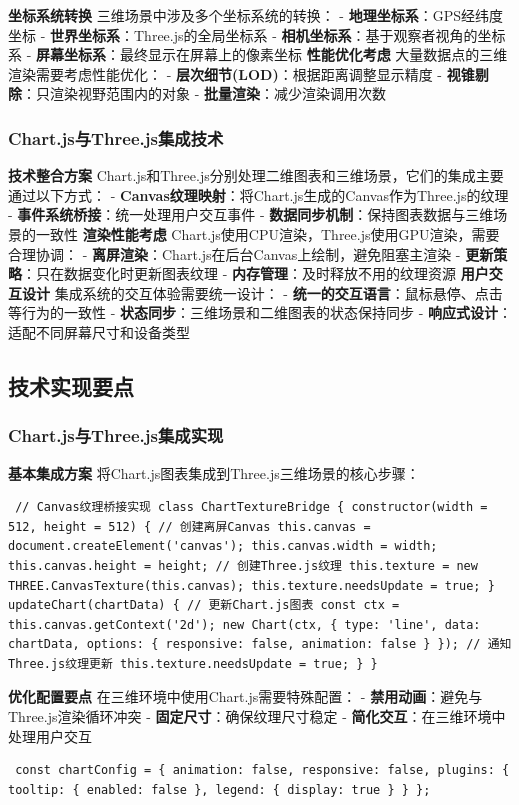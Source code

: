 \textbf{坐标系统转换} 三维场景中涉及多个坐标系统的转换： - \textbf{地理坐标系}：GPS经纬度坐标 - \textbf{世界坐标系}：Three.js的全局坐标系 - \textbf{相机坐标系}：基于观察者视角的坐标系 - \textbf{屏幕坐标系}：最终显示在屏幕上的像素坐标 \textbf{性能优化考虑} 大量数据点的三维渲染需要考虑性能优化： - \textbf{层次细节(LOD)}：根据距离调整显示精度 - \textbf{视锥剔除}：只渲染视野范围内的对象 - \textbf{批量渲染}：减少渲染调用次数 \subsubsection{Chart.js与Three.js集成技术}\label{chart.jsux4e0ethree.jsux96c6ux6210ux6280ux672f} \textbf{技术整合方案} Chart.js和Three.js分别处理二维图表和三维场景，它们的集成主要通过以下方式： - \textbf{Canvas纹理映射}：将Chart.js生成的Canvas作为Three.js的纹理 - \textbf{事件系统桥接}：统一处理用户交互事件 - \textbf{数据同步机制}：保持图表数据与三维场景的一致性 \textbf{渲染性能考虑} Chart.js使用CPU渲染，Three.js使用GPU渲染，需要合理协调： - \textbf{离屏渲染}：Chart.js在后台Canvas上绘制，避免阻塞主渲染 - \textbf{更新策略}：只在数据变化时更新图表纹理 - \textbf{内存管理}：及时释放不用的纹理资源 \textbf{用户交互设计} 集成系统的交互体验需要统一设计： - \textbf{统一的交互语言}：鼠标悬停、点击等行为的一致性 - \textbf{状态同步}：三维场景和二维图表的状态保持同步 - \textbf{响应式设计}：适配不同屏幕尺寸和设备类型 \subsection{技术实现要点}\label{ux6280ux672fux5b9eux73b0ux8981ux70b9} \subsubsection{Chart.js与Three.js集成实现}\label{chart.jsux4e0ethree.jsux96c6ux6210ux5b9eux73b0} \textbf{基本集成方案} 将Chart.js图表集成到Three.js三维场景的核心步骤： \begin{verbatim} // Canvas纹理桥接实现 class ChartTextureBridge { constructor(width = 512, height = 512) { // 创建离屏Canvas this.canvas = document.createElement('canvas'); this.canvas.width = width; this.canvas.height = height; // 创建Three.js纹理 this.texture = new THREE.CanvasTexture(this.canvas); this.texture.needsUpdate = true; } updateChart(chartData) { // 更新Chart.js图表 const ctx = this.canvas.getContext('2d'); new Chart(ctx, { type: 'line', data: chartData, options: { responsive: false, animation: false } }); // 通知Three.js纹理更新 this.texture.needsUpdate = true; } } \end{verbatim} \textbf{优化配置要点} 在三维环境中使用Chart.js需要特殊配置： - \textbf{禁用动画}：避免与Three.js渲染循环冲突 - \textbf{固定尺寸}：确保纹理尺寸稳定 - \textbf{简化交互}：在三维环境中处理用户交互 \begin{verbatim} const chartConfig = { animation: false, responsive: false, plugins: { tooltip: { enabled: false }, legend: { display: true } } }; \end{verbatim} 